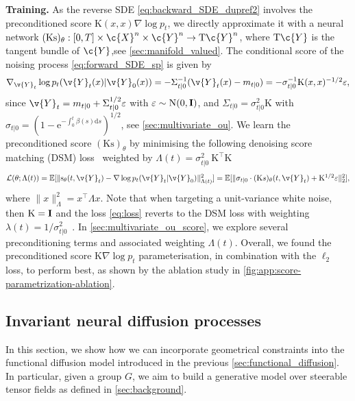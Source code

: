 \textbf{Training.}
As the reverse SDE \eqref{eq:backward_SDE_dupref2} involves the preconditioned score \(\mathrm{K}(x, x) \nabla \log p_t\), we directly approximate it with a neural network \((\mathrm{Ks})_\theta: [0, T] \times \c{X}^n \times \c{Y}^n \rightarrow \mathrm{T} \c{Y}^n\), where \(\mathrm{T} \c{Y}\) is the tangent bundle of \(\c{Y}\),see \cref{sec:manifold_valued}.
The conditional score of the noising process \eqref{eq:forward_SDE_sp} is given by \begin{equation} \textstyle \nabla_{{\v{Y}}_t} \log p_{t}({\v{Y}}_t(x)| \v{Y}_0(x)) = - \Sigma_{t|0}^{-1} (\v{Y}_t(x) - m_{t|0}) = - \sigma_{t|0}^{-1} \mathrm{K}(x,x)^{-1/2} \varepsilon , \end{equation} since \(\v{Y}_t = m_{t|0} + \Sigma_{t|0}^{1/2} \varepsilon\) with \(\varepsilon \sim \mathrm{N}(0, \m{I})\), and \(\Sigma_{t|0} = \sigma_{t|0}^2 \mathrm{K}\) with \(\sigma_{t|0} = (1 - \mathrm{e}^{-\int_{0}^t \beta(s) \mathrm{d} s})^{1/2}\), see \cref{sec:multivariate_ou}.
We learn the preconditioned score \((\mathrm{Ks})_\theta\) by minimising the following denoising score matching (DSM) loss~\parencite{Vincent2010} weighted by \(\Lambda(t) = \sigma_{t|0}^2~\mathrm{K}^\top \mathrm{K}\) \begin{align} \label{eq:loss} \textstyle \mathcal{L}(\theta; \Lambda(t)) = \mathbb{E} [\| \mathrm{s}_\theta(t, \v{Y}_t) - \nabla \log p_{t}({\v{Y}}_t| \v{Y}_0)\|_{\Lambda(t)}^2 ] = \mathbb{E} [ \| \sigma_{t|0}\cdot (\mathrm{K}s)_\theta(t,\v{Y}_t) + \mathrm{K}^{1/2} \varepsilon \|_2^2 ] , \end{align} where \(\|x\|^2_\Lambda = x^\top \Lambda x\).
Note that when targeting a unit-variance white noise, then \(\mathrm{K} = \m{I}\) and the loss \eqref{eq:loss} reverts to the DSM loss with weighting \(\lambda(t)=1/\sigma_{t|0}^2\)~\parencite{song2020score}.
In \cref{sec:multivariate_ou_score}, we explore several preconditioning terms and associated weighting \(\Lambda(t)\).
Overall, we found the preconditioned score \(\mathrm{K} \nabla \log p_t\) parameterisation, in combination with the \(\ell_2\) loss, to perform best, as shown by the ablation study in \cref{fig:app:score-parametrization-ablation}.

\subsection{Invariant neural diffusion processes}
\label{sec:equiv_ndp}

In this section, we show how we can incorporate geometrical constraints into the functional diffusion model introduced in the previous \cref{sec:functional_diffusion}.
In particular, given a group \(G\), we aim to build a generative model over steerable tensor fields as defined in \cref{sec:background}.

